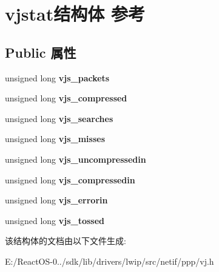 \hypertarget{structvjstat}{}\section{vjstat结构体 参考}
\label{structvjstat}
\subsection*{Public 属性}
\begin{DoxyCompactItemize}
\item 
\mbox{\label{structvjstat_a2b50d6db25bbdc93143842d446fac44d}} 
unsigned long {\bfseries vjs\+\_\+packets}
\item 
\mbox{\label{structvjstat_a7dee99324bc96c2cd6155761a8f73d0c}} 
unsigned long {\bfseries vjs\+\_\+compressed}
\item 
\mbox{\label{structvjstat_a5114111ddacf30b70a1c3e0f72aad3cc}} 
unsigned long {\bfseries vjs\+\_\+searches}
\item 
\mbox{\label{structvjstat_a6d3803979609940baf60dfd051f9e34c}} 
unsigned long {\bfseries vjs\+\_\+misses}
\item 
\mbox{\label{structvjstat_acacdc7b196bbd406ff410aaaaaf577af}} 
unsigned long {\bfseries vjs\+\_\+uncompressedin}
\item 
\mbox{\label{structvjstat_afc02319ee1959b904d2cb6bc064399ca}} 
unsigned long {\bfseries vjs\+\_\+compressedin}
\item 
\mbox{\label{structvjstat_a704bbd4ac21a9b8ed717361f4b425f66}} 
unsigned long {\bfseries vjs\+\_\+errorin}
\item 
\mbox{\label{structvjstat_aae07f59dbfe5baacc8b6c908f61afad8}} 
unsigned long {\bfseries vjs\+\_\+tossed}
\end{DoxyCompactItemize}


该结构体的文档由以下文件生成\+:\begin{DoxyCompactItemize}
\item 
E\+:/\+React\+O\+S-\/0../sdk/lib/drivers/lwip/src/netif/ppp/vj.\+h\end{DoxyCompactItemize}
